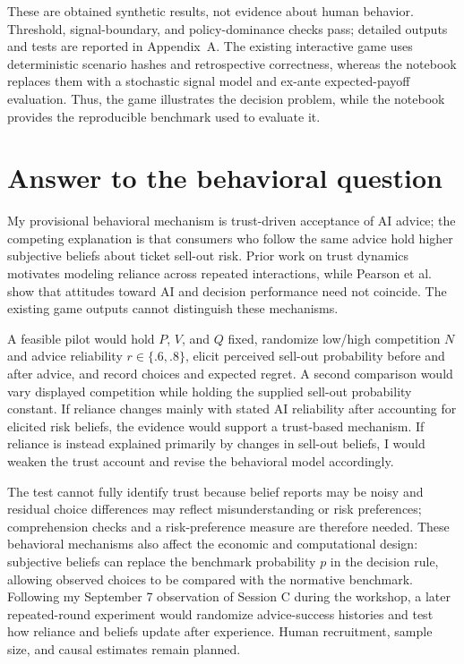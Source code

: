 These are obtained synthetic results, not evidence about human behavior. Threshold, signal-boundary, and policy-dominance checks pass; detailed outputs and tests are reported in Appendix~A. The existing interactive game uses deterministic scenario hashes and retrospective correctness, whereas the notebook replaces them with a stochastic signal model and ex-ante expected-payoff evaluation. Thus, the game illustrates the decision problem, while the notebook provides the reproducible benchmark used to evaluate it.

\section{Answer to the behavioral question}

My provisional behavioral mechanism is trust-driven acceptance of AI advice; the competing explanation is that consumers who follow the same advice hold higher subjective beliefs about ticket sell-out risk. Prior work on trust dynamics~\cite{li2023} motivates modeling reliance across repeated interactions, while Pearson et al.~\cite{pearson2026} show that attitudes toward AI and decision performance need not coincide. The existing game outputs cannot distinguish these mechanisms.

A feasible pilot would hold $P$, $V$, and $Q$ fixed, randomize low/high competition $N$ and advice reliability $r\in\{.6,.8\}$, elicit perceived sell-out probability before and after advice, and record choices and expected regret. A second comparison would vary displayed competition while holding the supplied sell-out probability constant. If reliance changes mainly with stated AI reliability after accounting for elicited risk beliefs, the evidence would support a trust-based mechanism. If reliance is instead explained primarily by changes in sell-out beliefs, I would weaken the trust account and revise the behavioral model accordingly.

The test cannot fully identify trust because belief reports may be noisy and residual choice differences may reflect misunderstanding or risk preferences; comprehension checks and a risk-preference measure are therefore needed. These behavioral mechanisms also affect the economic and computational design: subjective beliefs can replace the benchmark probability $p$ in the decision rule, allowing observed choices to be compared with the normative benchmark. Following my September 7 observation of Session C during the workshop, a later repeated-round experiment would randomize advice-success histories and test how reliance and beliefs update after experience. Human recruitment, sample size, and causal estimates remain planned.

